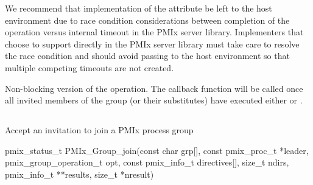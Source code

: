 
\optattrend

\adviceimplstart
We recommend that implementation of the  attribute be left to the host environment due to race condition considerations between completion of the operation versus internal timeout in the \ac{PMIx} server library. Implementers that choose to support  directly in the \ac{PMIx} server library must take care to resolve the race condition and should avoid passing  to the host environment so that multiple competing timeouts are not created.
\adviceimplend

\descr

Non-blocking version of the  operation. The callback function will be called once all invited members of the group (or their substitutes) have executed either  or .

\subsection{}

\summary

Accept an invitation to join a \ac{PMIx} process group

\format

\cspecificstart
\begin{codepar}
pmix_status_t
PMIx_Group_join(const char grp[],
                const pmix_proc_t *leader,
                pmix_group_operation_t opt,
                const pmix_info_t directives[], size_t ndirs,
                pmix_info_t **results, size_t *nresult)
\end{codepar}
\cspecificend

\begin{arglist}
\end{arglist}

